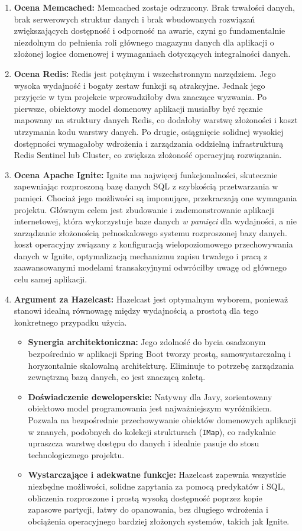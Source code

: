 \begin{enumerate}
    \item \textbf{Ocena Memcached:} Memcached zostaje odrzucony. Brak trwałości danych, brak serwerowych struktur danych i brak wbudowanych rozwiązań zwiększających dostępność i odporność na awarie, czyni go fundamentalnie niezdolnym do pełnienia roli głównego magazynu danych dla aplikacji o złożonej logice domenowej i wymaganiach dotyczących integralności danych.
    \item \textbf{Ocena Redis:} Redis jest potężnym i wszechstronnym narzędziem. Jego wysoka wydajność i bogaty zestaw funkcji są atrakcyjne. Jednak jego przyjęcie w tym projekcie wprowadziłoby dwa znaczące wyzwania. Po pierwsze, obiektowy model domenowy aplikacji musiałby być ręcznie mapowany na struktury danych Redis, co dodałoby warstwę złożoności i koszt utrzymania kodu warstwy danych. Po drugie, osiągnięcie solidnej wysokiej dostępności wymagałoby wdrożenia i zarządzania oddzielną infrastrukturą Redis Sentinel lub Cluster, co zwiększa złożoność operacyjną rozwiązania.
    \item \textbf{Ocena Apache Ignite:} Ignite ma najwięcej funkcjonalności, skutecznie zapewniając rozproszoną bazę danych SQL z szybkością przetwarzania w pamięci. Chociaż jego możliwości są imponujące, przekraczają one wymagania projektu. Głównym celem jest zbudowanie i zademonstrowanie aplikacji internetowej, która wykorzystuje baze danych \textit{w pamięci} dla wydajności, a nie zarządzanie złożonością pełnoskalowego systemu rozproszonej bazy danych. koszt operacyjny związany z konfiguracją wielopoziomowego przechowywania danych w Ignite, optymalizacją mechanizmu zapisu trwałego i pracą z zaawansowanymi modelami transakcyjnymi odwróciłby uwagę od głównego celu samej aplikacji.
    \item \textbf{Argument za Hazelcast:} Hazelcast jest optymalnym wyborem, ponieważ stanowi idealną równowagę między wydajnością a prostotą dla tego konkretnego przypadku użycia.
    \begin{itemize}
        \item \textbf{Synergia architektoniczna:} Jego zdolność do bycia osadzonym bezpośrednio w aplikacji Spring Boot tworzy prostą, samowystarczalną i horyzontalnie skalowalną architekturę. Eliminuje to potrzebę zarządzania zewnętrzną bazą danych, co jest znaczącą zaletą.
        \item \textbf{Doświadczenie deweloperskie:} Natywny dla Javy, zorientowany obiektowo model programowania jest najważniejszym wyróżnikiem. Pozwala na bezpośrednie przechowywanie obiektów domenowych aplikacji w znanych, podobnych do kolekcji strukturach (\texttt{IMap}), co radykalnie upraszcza warstwę dostępu do danych i idealnie pasuje do stosu technologicznego projektu.
        \item \textbf{Wystarczające i adekwatne funkcje:} Hazelcast zapewnia wszystkie niezbędne możliwości, solidne zapytania za pomocą predykatów i SQL, obliczenia rozproszone i prostą wysoką dostępność poprzez kopie zapasowe partycji, łatwy do opanowania, bez długiego wdrożenia i obciążenia operacyjnego bardziej złożonych systemów, takich jak Ignite.
    \end{itemize}
\end{enumerate}

